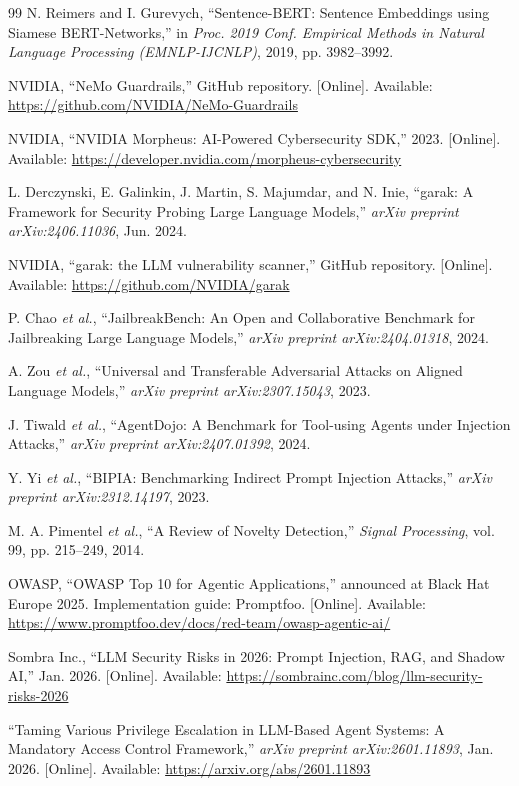 \documentclass[journal,12pt,onecolumn,draftclsnofoot]{IEEEtran}
\begin{document}
\begin{thebibliography}{99}
N. Reimers and I. Gurevych, ``Sentence-BERT: Sentence Embeddings using Siamese BERT-Networks,'' in \textit{Proc. 2019 Conf. Empirical Methods in Natural Language Processing (EMNLP-IJCNLP)}, 2019, pp. 3982--3992.

NVIDIA, ``NeMo Guardrails,'' GitHub repository. [Online]. Available: \url{https://github.com/NVIDIA/NeMo-Guardrails}

NVIDIA, ``NVIDIA Morpheus: AI-Powered Cybersecurity SDK,'' 2023. [Online]. Available: \url{https://developer.nvidia.com/morpheus-cybersecurity}

L. Derczynski, E. Galinkin, J. Martin, S. Majumdar, and N. Inie, ``garak: A Framework for Security Probing Large Language Models,'' \textit{arXiv preprint arXiv:2406.11036}, Jun. 2024.

NVIDIA, ``garak: the LLM vulnerability scanner,'' GitHub repository. [Online]. Available: \url{https://github.com/NVIDIA/garak}

P. Chao \textit{et al.}, ``JailbreakBench: An Open and Collaborative Benchmark for Jailbreaking Large Language Models,'' \textit{arXiv preprint arXiv:2404.01318}, 2024.

A. Zou \textit{et al.}, ``Universal and Transferable Adversarial Attacks on Aligned Language Models,'' \textit{arXiv preprint arXiv:2307.15043}, 2023.

J. Tiwald \textit{et al.}, ``AgentDojo: A Benchmark for Tool-using Agents under Injection Attacks,'' \textit{arXiv preprint arXiv:2407.01392}, 2024.

Y. Yi \textit{et al.}, ``BIPIA: Benchmarking Indirect Prompt Injection Attacks,'' \textit{arXiv preprint arXiv:2312.14197}, 2023.

M. A. Pimentel \textit{et al.}, ``A Review of Novelty Detection,'' \textit{Signal Processing}, vol. 99, pp. 215--249, 2014.

OWASP, ``OWASP Top 10 for Agentic Applications,'' announced at Black Hat Europe 2025. Implementation guide: Promptfoo. [Online]. Available: \url{https://www.promptfoo.dev/docs/red-team/owasp-agentic-ai/}

Sombra Inc., ``LLM Security Risks in 2026: Prompt Injection, RAG, and Shadow AI,'' Jan. 2026. [Online]. Available: \url{https://sombrainc.com/blog/llm-security-risks-2026}

``Taming Various Privilege Escalation in LLM-Based Agent Systems: A Mandatory Access Control Framework,'' \textit{arXiv preprint arXiv:2601.11893}, Jan. 2026. [Online]. Available: \url{https://arxiv.org/abs/2601.11893}

\end{thebibliography}
\end{document}
